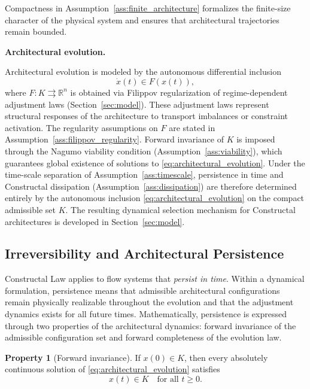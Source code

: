 \documentclass[12pt]{article}
\theoremstyle{plain}
\theoremstyle{definition}
\newtheorem{property}[theorem]{Property}
\theoremstyle{remark}
\begin{document}
Compactness in Assumption~\ref{ass:finite_architecture}
formalizes the finite-size character of the physical system and
ensures that architectural trajectories remain bounded.

\medskip

\noindent
\textbf{Architectural evolution.}

Architectural evolution is modeled by the autonomous differential
inclusion
\begin{equation}
\dot{x}(t)\in F(x(t)),
\label{eq:architectural_evolution}
\end{equation}
where $F:K\rightrightarrows\mathbb{R}^n$
is obtained via Filippov regularization of regime-dependent
adjustment laws (Section~\ref{sec:model}).
These adjustment laws represent structural responses of the
architecture to transport imbalances or constraint activation.
The regularity assumptions on $F$ are stated in
Assumption~\ref{ass:filippov_regularity}.
Forward invariance of $K$ is imposed through the
Nagumo viability condition (Assumption~\ref{ass:viability}),
which guarantees global existence of solutions
to \eqref{eq:architectural_evolution}.
Under the time-scale separation of
Assumption~\ref{ass:timescale},
persistence in time and Constructal dissipation
(Assumption~\ref{ass:dissipation})
are therefore determined entirely by the autonomous inclusion
\eqref{eq:architectural_evolution}
on the compact admissible set $K$.
The resulting dynamical selection mechanism
for Constructal architectures is developed in
Section~\ref{sec:model}.



\subsection{Irreversibility and Architectural Persistence}
\label{subsec:irreversibility}

Constructal Law applies to flow systems that \emph{persist in time}.
Within a dynamical formulation, persistence means that admissible
architectural configurations remain physically realizable throughout
the evolution and that the adjustment dynamics exists for all future
times. Mathematically, persistence is expressed through two properties of the
architectural dynamics: forward invariance of the admissible
configuration set and forward completeness of the evolution law.

\begin{property}[Forward invariance]
\label{prop:forward_invariance}
If $x(0)\in K$, then every absolutely continuous solution of
\eqref{eq:architectural_evolution} satisfies
\[
x(t)\in K
\quad \text{for all } t\ge 0.
\]
\end{property}
\end{document}
